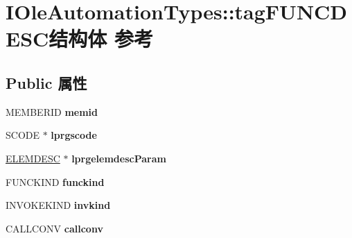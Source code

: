 \hypertarget{struct_i_ole_automation_types_1_1tag_f_u_n_c_d_e_s_c}{}\section{I\+Ole\+Automation\+Types\+:\+:tag\+F\+U\+N\+C\+D\+E\+S\+C结构体 参考}
\label{struct_i_ole_automation_types_1_1tag_f_u_n_c_d_e_s_c}
\subsection*{Public 属性}
\begin{DoxyCompactItemize}
\item 
\mbox{\label{struct_i_ole_automation_types_1_1tag_f_u_n_c_d_e_s_c_aff825f7d12d3f1ffc481503e7556b693}} 
M\+E\+M\+B\+E\+R\+ID {\bfseries memid}
\item 
\mbox{\label{struct_i_ole_automation_types_1_1tag_f_u_n_c_d_e_s_c_a9424ed3ef8503bef93815c3c5264b698}} 
S\+C\+O\+DE $\ast$ {\bfseries lprgscode}
\item 
\mbox{\label{struct_i_ole_automation_types_1_1tag_f_u_n_c_d_e_s_c_a1c1494cb32e56c1b4fa15744fd61c1f5}} 
\hyperlink{struct_i_ole_automation_types_1_1tag_e_l_e_m_d_e_s_c}{E\+L\+E\+M\+D\+E\+SC} $\ast$ {\bfseries lprgelemdesc\+Param}
\item 
\mbox{\label{struct_i_ole_automation_types_1_1tag_f_u_n_c_d_e_s_c_ae84f62f3a87fa9f38d2bd24d6bfd9c5e}} 
F\+U\+N\+C\+K\+I\+ND {\bfseries funckind}
\item 
\mbox{\label{struct_i_ole_automation_types_1_1tag_f_u_n_c_d_e_s_c_a2eedb433c15ceb1b5c02c284615b6b09}} 
I\+N\+V\+O\+K\+E\+K\+I\+ND {\bfseries invkind}
\item 
\mbox{\label{struct_i_ole_automation_types_1_1tag_f_u_n_c_d_e_s_c_a33bc84fba6e4ff9e062c848fbb989fb6}} 
C\+A\+L\+L\+C\+O\+NV {\bfseries callconv}
\item 

\end{DoxyCompactItemize}
